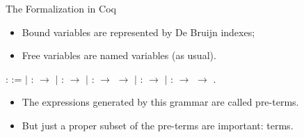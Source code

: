 \documentclass[10pt]{beamer}
\begin{document}
\begin{frame}[fragile]{The Formalization in Coq}

    \begin{itemize}
    \item Bound variables are represented by De Bruijn indexes;
    \item Free variables are named variables (as usual).
    \end{itemize}

  \begin{coqdoccode}
    \coqdocnoindent {}  :
     :=\coqdoceol \coqdocindent{1.00em} \ensuremath{|}
     :  \ensuremath{\rightarrow}
    \coqdoceol \coqdocindent{1.00em} \ensuremath{|}
     :  \ensuremath{\rightarrow}
    \coqdoceol \coqdocindent{1.00em} \ensuremath{|}
     : 
    \ensuremath{\rightarrow} 
    \ensuremath{\rightarrow} \coqdoceol
    \coqdocindent{1.00em} \ensuremath{|}  :
     \ensuremath{\rightarrow}
    \coqdoceol \coqdocindent{1.00em} \ensuremath{|}
     : 
    \ensuremath{\rightarrow} 
    \ensuremath{\rightarrow} .\coqdoceol
  \end{coqdoccode}

  \begin{itemize}
  \item The expressions generated by this grammar are called pre-terms.
  \item But just a proper subset of the pre-terms are important: terms.
  \end{itemize}

\end{frame}
\end{document}
